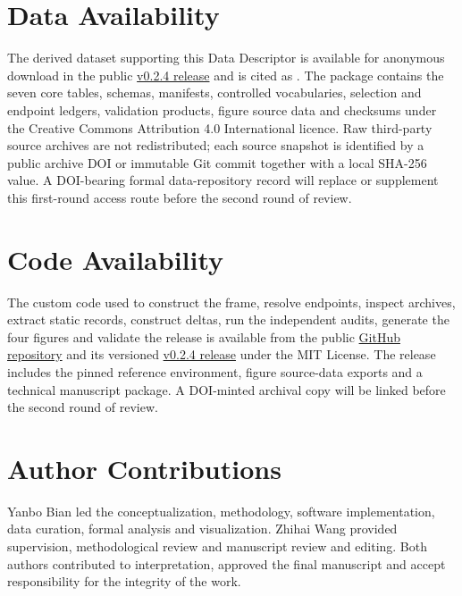 \documentclass[10pt,a4paper]{article}
\begin{document}
\section*{Data Availability}

The derived dataset supporting this Data Descriptor is available for anonymous download in the public \href{https://github.com/bianyanbo44-afk/reprodecay-scidata/releases/tag/v0.2.4}{v0.2.4 release} and is cited as \cite{bian2026paired}. The package contains the seven core tables, schemas, manifests, controlled vocabularies, selection and endpoint ledgers, validation products, figure source data and checksums under the Creative Commons Attribution 4.0 International licence. Raw third-party source archives are not redistributed; each source snapshot is identified by a public archive DOI or immutable Git commit together with a local SHA-256 value. A DOI-bearing formal data-repository record will replace or supplement this first-round access route before the second round of review.

\section*{Code Availability}

The custom code used to construct the frame, resolve endpoints, inspect archives, extract static records, construct deltas, run the independent audits, generate the four figures and validate the release is available from the public \href{https://github.com/bianyanbo44-afk/reprodecay-scidata}{GitHub repository} and its versioned \href{https://github.com/bianyanbo44-afk/reprodecay-scidata/releases/tag/v0.2.4}{v0.2.4 release} under the MIT License. The release includes the pinned reference environment, figure source-data exports and a technical manuscript package. A DOI-minted archival copy will be linked before the second round of review.

{\small


}

\section*{Author Contributions}

Yanbo Bian led the conceptualization, methodology, software implementation, data curation, formal analysis and visualization. Zhihai Wang provided supervision, methodological review and manuscript review and editing. Both authors contributed to interpretation, approved the final manuscript and accept responsibility for the integrity of the work.
\end{document}

